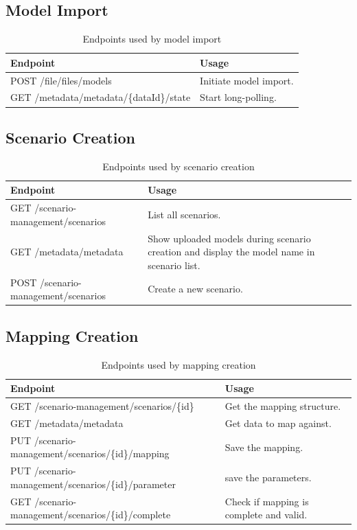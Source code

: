 \subsection{Model Import}
\begin{table}[H]
	\caption{Endpoints used by model import}
	\begin{tabularx}{\textwidth}{|l|X|}
		\hline
		\textbf{Endpoint} & \textbf{Usage} \\ \hline
		POST /file/files/models & Initiate model import. \\ \hline
		GET /metadata/metadata/\{dataId\}/state & Start long-polling. \\ \hline
	\end{tabularx}
\end{table}


\subsection{Scenario Creation}
\begin{table}[H]
	\caption{Endpoints used by scenario creation}
	\begin{tabularx}{\textwidth}{|l|X|}
		\hline
		\textbf{Endpoint} & \textbf{Usage} \\ \hline
		GET /scenario-management/scenarios & List all scenarios. \\ \hline
		GET /metadata/metadata & Show uploaded models during scenario creation and display  the model name in scenario list. \\ \hline
		POST /scenario-management/scenarios & Create a new scenario. \\ \hline
	\end{tabularx}
\end{table}


\subsection{Mapping Creation}
\begin{table}[H]
	\caption{Endpoints used by mapping creation}
	\begin{tabularx}{\textwidth}{|l|X|}
		\hline
		\textbf{Endpoint} & \textbf{Usage} \\ \hline
		GET /scenario-management/scenarios/\{id\} & Get the mapping structure. \\ \hline
		GET /metadata/metadata & Get data to map against. \\ \hline
		PUT /scenario-management/scenarios/\{id\}/mapping & Save the mapping. \\ \hline
		PUT /scenario-management/scenarios/\{id\}/parameter & save the parameters. \\ \hline
		GET /scenario-management/scenarios/\{id\}/complete & Check if mapping is complete and valid. \\ \hline
	\end{tabularx}
\end{table}



